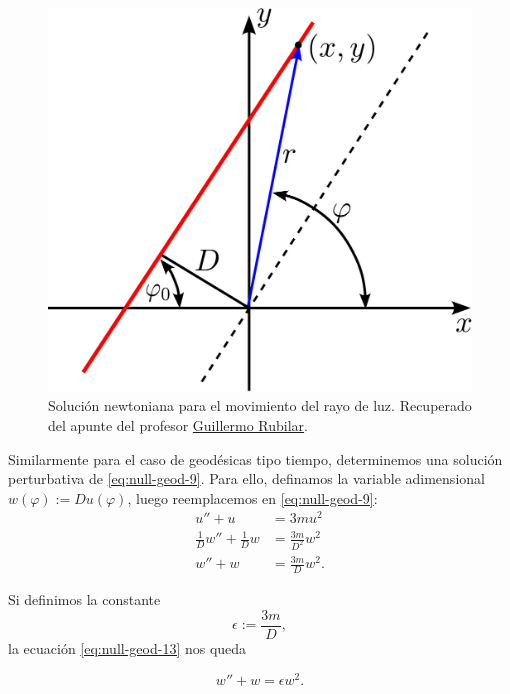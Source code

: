 \documentclass[letterpaper,11pt]{article}
\begin{document}
\begin{figure}
\centering
\includegraphics[scale=0.35]{fig-recta}
\caption{Solución newtoniana para el movimiento del rayo de luz. Recuperado del apunte del profesor \href{https://github.com/gfrubi/RG}{Guillermo Rubilar}.}
\label{fig:rayo-luz-newton}
\end{figure}

Similarmente para el caso de geodésicas tipo tiempo, determinemos una solución perturbativa de \eqref{eq:null-geod-9}. Para ello, definamos la variable adimensional $w(\varphi) := D u(\varphi)$, luego reemplacemos en \eqref{eq:null-geod-9}:
\begin{align}
u'' + u &= 3mu^2 \\
\frac{1}{D}w'' + \frac{1}{D} w &= \frac{3m}{D^2} w^2 \\
w'' + w &= \frac{3m}{D} w^2. \label{eq:null-geod-13}
\end{align}

Si definimos la constante
\begin{equation}
\epsilon := \frac{3m}{D},
\end{equation}
la ecuación \eqref{eq:null-geod-13} nos queda
\begin{shaded}
\begin{equation}\label{eq:null-geod-14}
w'' + w = \epsilon w^2.
\end{equation}
\end{shaded}
\end{document}
